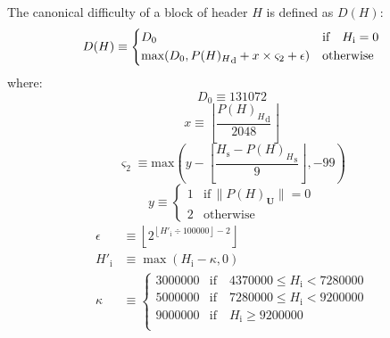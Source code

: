 \documentclass[9pt,oneside]{amsart}
\makeatletter
\newcommand{\linkdest}[1]{\Hy@raisedlink{\hypertarget{#1}{}}}
\makeatother
\begin{document}
\begin{multicols}{2}
\newcommand{\mindifficulty}{D_0}
\newcommand{\homesteadmod}{\ensuremath{\varsigma_2}}
\newcommand{\expdiffsymb}{\ensuremath{\epsilon}}
\newcommand{\diffadjustment}{x}

\hypertarget{block_difficulty_H__d}{}\linkdest{H__d}The canonical difficulty of a block of header $H$ is defined as $D(H)$:
\begin{equation}
D(H) \equiv \begin{dcases}
\mindifficulty & \text{if} \quad H_{\mathrm{i}} = 0\\
\text{max}\!\left(\mindifficulty, {P(H)_{H}}_{\mathrm{d}} + \diffadjustment\times\homesteadmod + \expdiffsymb \right) & \text{otherwise}\\
\end{dcases}
\end{equation}
where:
\begin{equation}
\mindifficulty \equiv 131072
\end{equation}
\begin{equation}
\diffadjustment \equiv \left\lfloor\frac{{P(H)_{H}}_{\mathrm{d}}}{2048}\right\rfloor
\end{equation}
\begin{equation}
\homesteadmod \equiv \text{max}\left( y - \left\lfloor\frac{H_{\mathrm{s}} - {P(H)_{H}}_{\mathrm{s}}}{9}\right\rfloor, -99 \right)
\end{equation}
\begin{equation*}
y \equiv \begin{cases}
1 & \text{if} \, \lVert P(H)_{\mathbf{U}}\rVert = 0 \\
2 & \text{otherwise}
\end{cases}
\end{equation*}
\begin{align}
\expdiffsymb &\equiv \left\lfloor 2^{ \left\lfloor H'_{\mathrm{i}} \div 100000 \right\rfloor - 2 } \right\rfloor \\
H'_{\mathrm{i}} &\equiv \max(H_{\mathrm{i}} - \kappa, 0) \\
\kappa &\equiv \begin{cases} 
  3000000  & \text{if} \quad 4370000 \leqslant H_{\mathrm{i}} < 7280000 \\
  5000000  & \text{if} \quad 7280000 \leqslant H_{\mathrm{i}} < 9200000 \\
  9000000  & \text{if} \quad H_{\mathrm{i}} \geqslant 9200000 \\
\end{cases}
\end{align}


\end{multicols}
\end{document}
